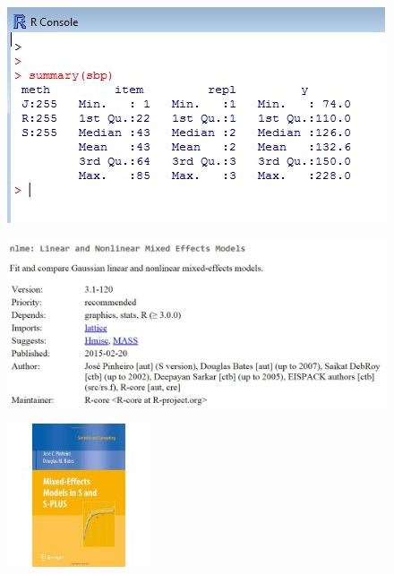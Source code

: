 \documentclass[compress]{beamer}        %
\begin{document}
\begin{frame}
	\begin{figure}
\centering
\includegraphics[width=0.9\linewidth]{images/sbpsummary}

\end{figure}

\end{frame}		
\begin{frame}
	\begin{figure}
\centering
\includegraphics[width=1.1\linewidth]{images/CRAN-nlme}

\end{figure}

\end{frame}
\begin{frame}
	\begin{figure}
\centering
\includegraphics[width=0.6\linewidth]{images/PinheiroBates}

\end{figure}

\end{frame}
\end{document}
